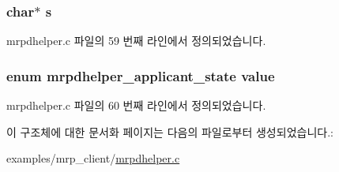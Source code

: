 \subsubsection[{\texorpdfstring{s}{s}}]{\setlength{\rightskip}{0pt plus 5cm}char$\ast$ s}\hypertarget{structapp__state__to__enum_ab51cd24d34f6509eafb5e059f4c7d10e}{}\label{structapp__state__to__enum_ab51cd24d34f6509eafb5e059f4c7d10e}


mrpdhelper.\+c 파일의 59 번째 라인에서 정의되었습니다.

\subsubsection[{\texorpdfstring{value}{value}}]{\setlength{\rightskip}{0pt plus 5cm}enum {\bf mrpdhelper\+\_\+applicant\+\_\+state} value}\hypertarget{structapp__state__to__enum_a3f2cd28210b71e61a01e29b0686f63d4}{}\label{structapp__state__to__enum_a3f2cd28210b71e61a01e29b0686f63d4}


mrpdhelper.\+c 파일의 60 번째 라인에서 정의되었습니다.



이 구조체에 대한 문서화 페이지는 다음의 파일로부터 생성되었습니다.\+:\begin{DoxyCompactItemize}
\item 
examples/mrp\+\_\+client/\hyperlink{mrpdhelper_8c}{mrpdhelper.\+c}\end{DoxyCompactItemize}
